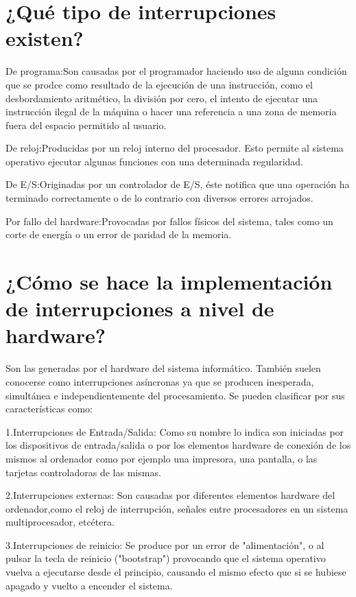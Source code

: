 \documentclass[11pt]{article}
\begin{document}
\section{¿Qué tipo de interrupciones existen?}

De programa:Son causadas por el programador haciendo uso de alguna condición que se prodce como resultado de la ejecución de una instrucción, como el desbordamiento aritmético, la división por cero, el intento de ejecutar una instrucción ilegal de la máquina o hacer una referencia a una zona de memoria fuera del espacio permitido al usuario.

De reloj:Producidas por un reloj interno del procesador. Esto permite al sistema operativo ejecutar algunas funciones con una determinada regularidad.

De E/S:Originadas por un controlador de E/S, éste notifica que una operación ha terminado correctamente o de lo contrario con diversos errores arrojados.

Por fallo del hardware:Provocadas por fallos físicos del sistema, tales como un corte de energía o un error de paridad de la memoria.

\section{¿Cómo se hace la implementación de interrupciones a nivel de hardware?}

Son las generadas por el hardware del sistema informático. También suelen conocerse como interrupciones asíncronas ya que se producen inesperada, simultánea e independientemente del procesamiento. Se pueden clasificar por sus características como:

1.Interrupciones de Entrada/Salida: Como su nombre lo indica son iniciadas por los dispositivos de entrada/salida o por los elementos hardware de conexión de los mismos al ordenador como por ejemplo una impresora, una pantalla, o las tarjetas controladoras de las mismas.

2.Interrupciones externas: Son causadas por diferentes elementos hardware del ordenador,como el reloj de interrupción, señales entre procesadores en un sistema multiprocesador, etcétera.

3.Interrupciones de reinicio: Se produce por un error de "alimentación", o al pulsar la tecla de reinicio ("bootstrap") provocando que el sistema operativo vuelva a ejecutarse desde el principio, causando el mismo efecto que si se hubiese apagado y vuelto a encender el sistema.
\end{document}
